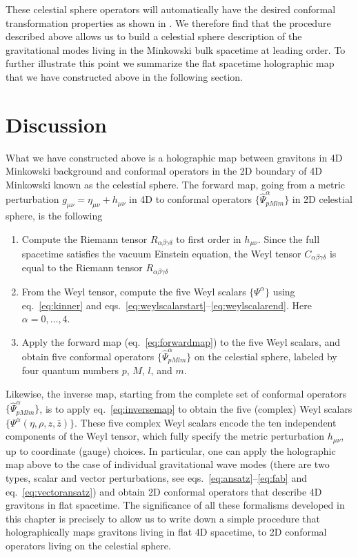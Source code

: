 \documentclass{brownthesis}
\begin{document}
These celestial sphere operators will automatically have the desired
conformal transformation properties as shown in \cite{Liu:2021tif}.
We therefore find that the procedure described above allows us to
build a celestial sphere description of the gravitational modes living
in the Minkowski bulk spacetime at leading order. To further illustrate
this point we summarize the flat spacetime holographic map that we
have constructed above in the following section.

\section{Discussion}

What we have constructed above is a holographic map between gravitons
in 4D Minkowski background and conformal operators in the 2D boundary
of 4D Minkowski known as the celestial sphere. The forward map, going
from a metric perturbation $g_{\mu\nu}=\eta_{\mu\nu}+h_{\mu\nu}$
in 4D to conformal operators $\{\hat{\Psi}_{pMlm}^{\alpha}\}$ in
2D celestial sphere, is the following
\begin{enumerate}
\item Compute the Riemann tensor $R_{\alpha\beta\gamma\delta}$ to first
order in $h_{\mu\nu}$. Since the full spacetime satisfies the vacuum
Einstein equation, the Weyl tensor $C_{\alpha\beta\gamma\delta}$
is equal to the Riemann tensor $R_{\alpha\beta\gamma\delta}$
\item From the Weyl tensor, compute the five Weyl scalars $\{\Psi^{\alpha}\}$
using eq.~\ref{eq:kinner} and eqs.~\ref{eq:weylscalarstart}--\ref{eq:weylscalarend}.
Here $\alpha=0,\ldots,4$.
\item Apply the forward map (eq.~\ref{eq:forwardmap}) to the five Weyl
scalars, and obtain five conformal operators $\{\hat{\Psi}_{pMlm}^{\alpha}\}$
on the celestial sphere, labeled by four quantum numbers $p$, $M$,
$l$, and $m$.
\end{enumerate}
Likewise, the inverse map, starting from the complete set of conformal
operators $\{\hat{\Psi}_{pMlm}^{\alpha}\}$, is to apply eq.~\ref{eq:inversemap}
to obtain the five (complex) Weyl scalars $\{\Psi^{\alpha}(\eta,\rho,z,\bar{z})\}$.
These five complex Weyl scalars encode the ten independent components
of the Weyl tensor, which fully specify the metric perturbation $h_{\mu\nu}$,
up to coordinate (gauge) choices. In particular, one can apply the
holographic map above to the case of individual gravitational wave
modes (there are two types, scalar and vector perturbations, see eqs.~\ref{eq:ansatz}--\ref{eq:fab}
and eq.~\ref{eq:vectoransatz}) and obtain 2D conformal operators
that describe 4D gravitons in flat spacetime. The significance of
all these formalisms developed in this chapter is precisely to allow
us to write down a simple procedure that holographically maps gravitons
living in flat 4D spacetime, to 2D conformal operators living on the
celestial sphere.
\end{document}

